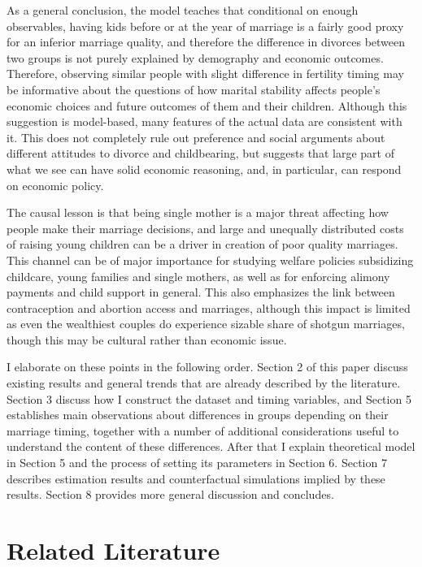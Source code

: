 \documentclass[12pt,letter]{article}
\begin{document}
As a general conclusion, the model teaches that conditional on enough observables, having kids before or at the year of marriage is a fairly good proxy for an inferior marriage quality, and therefore the difference in divorces between two groups is not purely explained by demography and economic outcomes. Therefore, observing similar people with slight difference in fertility timing may be informative about the questions of how marital stability affects people's economic choices and future outcomes of them and their children. Although this suggestion is model-based, many features of the actual data are consistent with it. This does not completely rule out preference and social arguments about different attitudes to divorce and childbearing, but suggests that large part of what we see can have solid economic reasoning, and, in particular, can respond on economic policy. 

The causal lesson is that being single mother is a major threat affecting how people make their marriage decisions, and large and unequally distributed costs of raising young children can be a driver in creation of poor quality marriages. This channel can be of major importance for studying welfare policies subsidizing childcare, young families and single mothers, as well as for enforcing alimony payments and child support in general. This also emphasizes the link between contraception and abortion access and marriages, although this impact is limited as even the wealthiest couples do experience sizable share of shotgun marriages, though this may be cultural rather than economic issue.

I elaborate on these points in the following order. Section 2 of this paper discuss existing results and general trends that are already described by the literature. Section 3 discuss how I construct the dataset and timing variables, and Section 5 establishes main observations about differences in groups depending on their marriage timing, together with a number of additional considerations useful to understand the content of these differences. After that I explain theoretical model in Section 5 and the process of setting its parameters in Section 6. Section 7 describes estimation results and counterfactual simulations implied by these results. Section 8 provides more general discussion and concludes.

\section{Related Literature}
\end{document}
